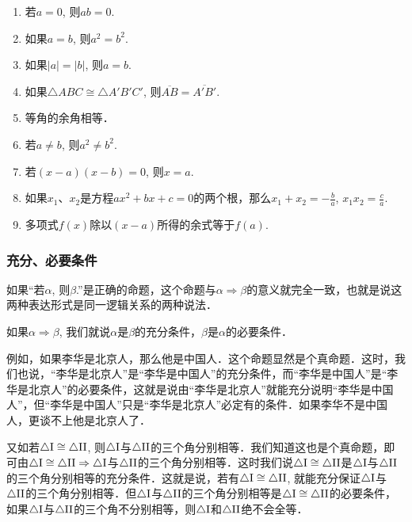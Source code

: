 \begin{ex}
\begin{enumerate}
		\begin{enumerate}
			\item 若$a=0$, 则$ab=0$.
			\item 如果$a=b$, 则$a^2=b^2$.
			\item 如果$|a|=|b|$, 则$a=b$.
			\item 如果$\triangle ABC\cong \triangle A'B'C'$, 则$\overline{AB}=\overline{A'B'}$.
			\item 等角的余角相等．
			\item 若$a\ne b$, 则$a^2\ne b^2$.
			\item 若$(x-a)(x-b)=0$, 则$x=a$.
			\item 如果$x_1$、$x_2$是方程$ax^2+bx+c=0$的两个根，那么$x_1+x_2=-\frac{b}{a}$, $x_1x_2=\frac{c}{a}$.
			\item 多项式$f(x)$除以$(x-a)$所得的余式等于$f(a)$.
		\end{enumerate}
	\end{enumerate}
\end{ex}

\subsubsection{充分、必要条件}

如果“若$\alpha$, 则$\beta$.”是正确的命题，这个命题与$\alpha\Rightarrow\beta$的意义就完全一致，也就是说这两种表达形式是同一逻辑关系的两种说法．

\begin{blk}{}
	如果$\alpha\Rightarrow\beta$, 我们就说$\alpha$是$\beta$的充分条件，$\beta$是$\alpha$的必要条件．  
\end{blk}

例如，如果李华是北京人，那么他是中国人．这个命题显然是个真命题．这时，我们也说，“李华是北京人”是“李华是中国人”的充分条件，而“李华是中国人”是“李华是北京人”的必要条件，这就是说由“李华是北京人”就能充分说明“李华是中国人”，但“李华是中国人”只是“李华是北京人”必定有的条件．如果李华不是中国人，更谈不上他是北京人了．

又如若$\triangle {\rm I}\cong \triangle {\rm II}$, 则$\triangle {\rm I}$与$\triangle {\rm II}$的三个角分别相等．我们知道这也是个真命题，即可由$\triangle {\rm I}\cong \triangle {\rm II}\Rightarrow \triangle {\rm I}$与$\triangle {\rm II}$的三个角分别相等．这时我们说$\triangle {\rm I}\cong \triangle {\rm II}$是$\triangle {\rm I}$与$\triangle {\rm II}$的三个角分别相等的充分条件．这就是说，若有$\triangle {\rm I}\cong\triangle {\rm II}$, 就能充分保证$\triangle {\rm I}$与$\triangle {\rm II}$的三个角分别相等．但$\triangle {\rm I}$与$\triangle {\rm II}$的三个角分别相等是$\triangle {\rm I}\cong \triangle {\rm II}$的必要条件，如果$\triangle {\rm I}$与$\triangle {\rm II}$的三个角不分别相等，则$\triangle {\rm I}$和$\triangle {\rm II}$绝不会全等．

